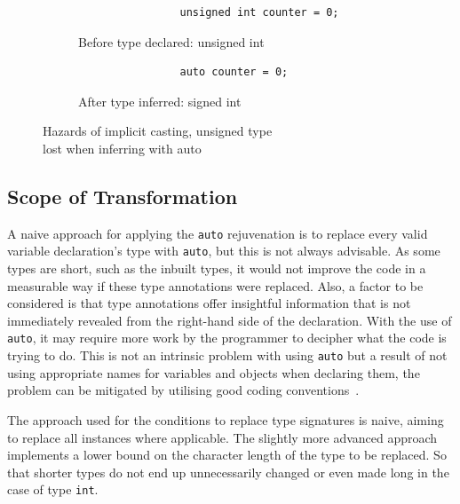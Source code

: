 \documentclass[bsc,frontabs,singlespacing,twoside,parskip,deptreport]{infthesis}
\begin{document}
\begin{figure}[!h]
    \centering
    \begin{subfigure}[h]{\textwidth}
        \centering
        \begin{verbatim}
                unsigned int counter = 0;
        \end{verbatim}
        \caption{Before type declared: unsigned int}
        \label{fig:implicit-cast-before}
        \vspace{0.40cm}
    \end{subfigure}
    \begin{subfigure}[h]{\textwidth}
        \centering
        \begin{verbatim}
                auto counter = 0; 
        \end{verbatim}
        \caption{After type inferred: signed int}
        \label{fig:implicit-cast-after}
    \end{subfigure}
    \caption{Hazards of implicit casting, unsigned type \\ lost when inferring with auto}
    \label{fig:implicit-cast}
\end{figure}

\subsection{Scope of Transformation}\label{sec:auto-scop-trans}

A naive approach for applying the \texttt{auto} rejuvenation is to replace every valid variable declaration's type with \texttt{auto}, but this is not always advisable. As some types are short, such as the inbuilt types, it would not improve the code in a measurable way if these type annotations were replaced. Also, a factor to be considered is that type annotations offer insightful information that is not immediately revealed from the right-hand side of the declaration. With the use of \texttt{auto}, it may require more work by the programmer to decipher what the code is trying to do. This is not an intrinsic problem with using \texttt{auto} but a result of not using appropriate names for variables and objects when declaring them, the problem can be mitigated by utilising good coding conventions~\cite{GOOGLE_CODING_STYLE}. 

The approach used for the conditions to replace type signatures is naive, aiming to replace all instances where applicable. The slightly more advanced approach implements a lower bound on the character length of the type to be replaced. So that shorter types do not end up unnecessarily changed or even made long in the case of type \texttt{int}.
\end{document}
